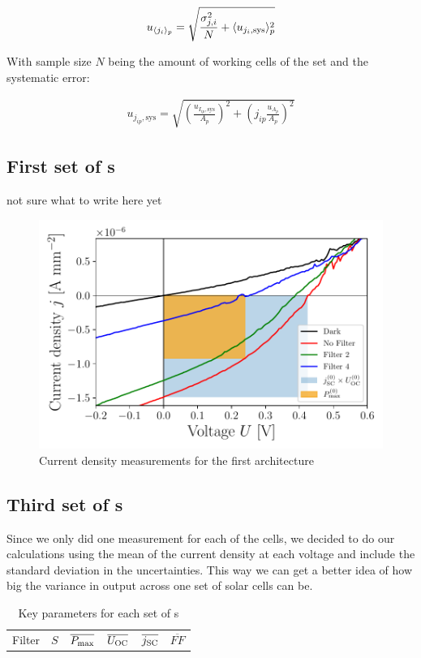\documentclass[a4paper,10pt,twocolumn]{article}
\begin{document}
\begin{extract*}
\begin{align}
	u_{\langle j_i \rangle_p} = \sqrt{\frac{\sigma_{j,i}^2}{N} + \langle u_{j_i,\text{sys}} \rangle_p^2}
\end{align}

With sample size $N$ being the amount of working cells of the set and the systematic error:

\begin{align}
	u_{j_{ip},\text{sys}} = \sqrt{ \left( \frac{ u_{I_{ip},\text{sys}}}{A_p}\right)^2+\left( j_{ip}\frac{u_{A_p}}{A_p} \right)^2}
\end{align}

\subsection{First set of \BHSC s}

not sure what to write here yet

\begin{figure}[h]\centering
	\includegraphics[width=\columnwidth]{../../../IV-Curve-Analysis/OSC1Graph.pdf}
	\caption{Current density measurements for the first architecture}
	\label{fig:OSC1Graph}
\end{figure}

\subsection{Third set of \BHSC s}

Since we only did one measurement for each of the cells, we decided to do our calculations using the mean of the current density at each voltage and include the standard deviation in the uncertainties. This way we can get a better idea of how big the variance in output across one set of solar cells can be.

\begin{table}[h]\centering
	\caption{Key parameters for each set of \BHSC s}
	\label{tab:keyparams}
	\begin{tabular}{@{}cccccc@{}}\toprule
		Filter & $S$ & $\overline{P_{\text{max}}}$ & $\overline{U_{\text{OC}}}$ & $\overline{j_{\text{SC}}}$ &$\overline{FF}$
	\end{tabular}
\end{table}

\end{extract*}
\end{document}
